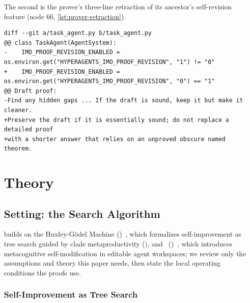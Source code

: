 The second is the prover's three-line retraction of its ancestor's self-revision feature (node 66, \cref{lst:prover-retraction}).

\begin{lstlisting}[style=rsdiff, caption={Node 66's retraction (proof run): the inherited self-revision pass is disabled by default and the revision instruction is rewritten to preserve sound drafts, on the recorded grounds that revision ``could degrade a correct/near-correct detailed proof into a weaker black-box citation-based proof.''}, label={lst:prover-retraction}]
diff --git a/task_agent.py b/task_agent.py
@@ class TaskAgent(AgentSystem):
-    IMO_PROOF_REVISION_ENABLED = os.environ.get("HYPERAGENTS_IMO_PROOF_REVISION", "1") != "0"
+    IMO_PROOF_REVISION_ENABLED = os.environ.get("HYPERAGENTS_IMO_PROOF_REVISION", "0") == "1"
@@ Draft proof:
-Find any hidden gaps ... If the draft is sound, keep it but make it cleaner.
+Preserve the draft if it is essentially sound; do not replace a detailed proof
+with a shorter answer that relies on an unproved obscure named theorem.
\end{lstlisting}


\section{Theory}
\label{app:proofs}


\subsection{Setting: the \texorpdfstring{\hgm}{HGM} Search Algorithm}
\label{app:prelim}

\ourmethod builds on the Huxley-G\"odel Machine (\hgm)~\citep{wang2025huxley}, which formalizes self-improvement as tree search guided by clade metaproductivity (\cmp), and \hyperagents~(\dgmh)~\citep{zhang2026hyperagents}, which introduces metacognitive self-modification in editable agent workspaces; we review only the assumptions and theory this paper needs, then state the local operating conditions the proofs use.

\subsubsection{Self-Improvement as Tree Search}
\label{sec:prelim:tree}

